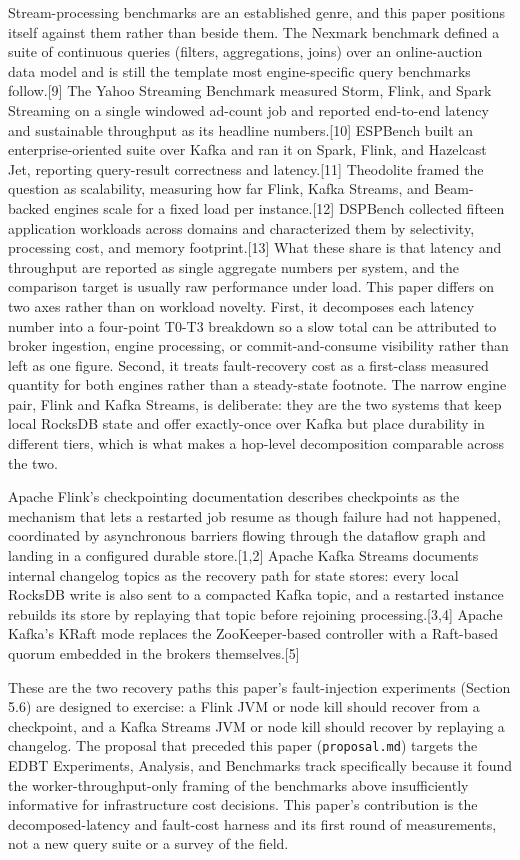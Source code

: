 \documentclass[
]{article}
\begin{document}
Stream-processing benchmarks are an established genre, and this paper
positions itself against them rather than beside them. The Nexmark
benchmark defined a suite of continuous queries (filters, aggregations,
joins) over an online-auction data model and is still the template most
engine-specific query benchmarks follow.{[}9{]} The Yahoo Streaming
Benchmark measured Storm, Flink, and Spark Streaming on a single
windowed ad-count job and reported end-to-end latency and sustainable
throughput as its headline numbers.{[}10{]} ESPBench built an
enterprise-oriented suite over Kafka and ran it on Spark, Flink, and
Hazelcast Jet, reporting query-result correctness and latency.{[}11{]}
Theodolite framed the question as scalability, measuring how far Flink,
Kafka Streams, and Beam-backed engines scale for a fixed load per
instance.{[}12{]} DSPBench collected fifteen application workloads
across domains and characterized them by selectivity, processing cost,
and memory footprint.{[}13{]} What these share is that latency and
throughput are reported as single aggregate numbers per system, and the
comparison target is usually raw performance under load. This paper
differs on two axes rather than on workload novelty. First, it
decomposes each latency number into a four-point T0-T3 breakdown so a
slow total can be attributed to broker ingestion, engine processing, or
commit-and-consume visibility rather than left as one figure. Second, it
treats fault-recovery cost as a first-class measured quantity for both
engines rather than a steady-state footnote. The narrow engine pair,
Flink and Kafka Streams, is deliberate: they are the two systems that
keep local RocksDB state and offer exactly-once over Kafka but place
durability in different tiers, which is what makes a hop-level
decomposition comparable across the two.

Apache Flink's checkpointing documentation describes checkpoints as the
mechanism that lets a restarted job resume as though failure had not
happened, coordinated by asynchronous barriers flowing through the
dataflow graph and landing in a configured durable store.{[}1,2{]}
Apache Kafka Streams documents internal changelog topics as the recovery
path for state stores: every local RocksDB write is also sent to a
compacted Kafka topic, and a restarted instance rebuilds its store by
replaying that topic before rejoining processing.{[}3,4{]} Apache
Kafka's KRaft mode replaces the ZooKeeper-based controller with a
Raft-based quorum embedded in the brokers themselves.{[}5{]}

These are the two recovery paths this paper's fault-injection
experiments (Section 5.6) are designed to exercise: a Flink JVM or node
kill should recover from a checkpoint, and a Kafka Streams JVM or node
kill should recover by replaying a changelog. The proposal that preceded
this paper (\texttt{proposal.md}) targets the EDBT Experiments,
Analysis, and Benchmarks track specifically because it found the
worker-throughput-only framing of the benchmarks above insufficiently
informative for infrastructure cost decisions. This paper's contribution
is the decomposed-latency and fault-cost harness and its first round of
measurements, not a new query suite or a survey of the field.
\end{document}
